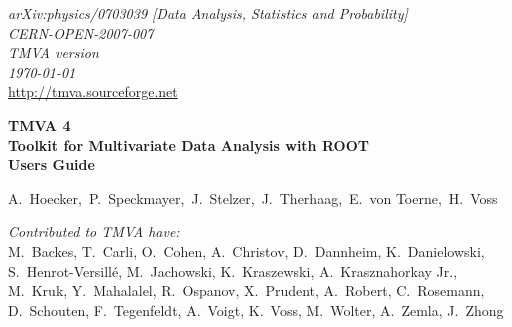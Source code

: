 \vspace{-1cm}
\begin{flushright}
{\sf\em arXiv:physics/0703039 [Data Analysis, Statistics and Probability]} \\
{\sf\em CERN-OPEN-2007-007} \\
{\sf\em TMVA version \TMVAVersion} \\
{\sf\em \today} \\
\def\UrlFont{\sf\em}
\url{http://tmva.sourceforge.net} 
\end{flushright}
\def\UrlFont{\rm}

\def\miniPageOffset{0.2cm}
\def\miniPageWidth{13.5cm}
\HRule
\begin{flushleft}
\hspace{\miniPageOffset}\begin{minipage}{\miniPageWidth}
{\sf\Huge\bfseries\boldmath TMVA 4} \\[0.2cm]
{\sf\Large\bfseries\boldmath Toolkit for Multivariate Data Analysis with ROOT} \\[1cm]
{\sf\Huge\bfseries\boldmath Users Guide} 
\end{minipage}
\end{flushleft}
\HRule
\vspace{2.0cm}
\begin{flushright}
{\sf\Large  A.~Hoecker,~P.~Speckmayer,~J.~Stelzer,~J.~Therhaag,~E.~von Toerne,~H.~Voss} 

\vspace{1.2cm}
{\sf\em\large Contributed to TMVA have:} \\[0.4cm]
{\sf\large 
M.~Backes,
T.~Carli,
O.~Cohen,
A.~Christov, 
D.~Dannheim,
K.~Danielowski,\\[0.1cm]
S.~Henrot-Versill\'e, 
M.~Jachowski, 
K.~Kraszewski,
A.~Krasznahorkay Jr.,  \\[0.1cm]    
M.~Kruk,
Y.~Mahalalel, 
R.~Ospanov, 
X.~Prudent, 
A.~Robert,
C.~Rosemann, \\[0.1cm]  
D.~Schouten, 
F.~Tegenfeldt,
A.~Voigt,
K.~Voss,
M.~Wolter, 
A.~Zemla,
J.~Zhong
}

\end{flushright}

